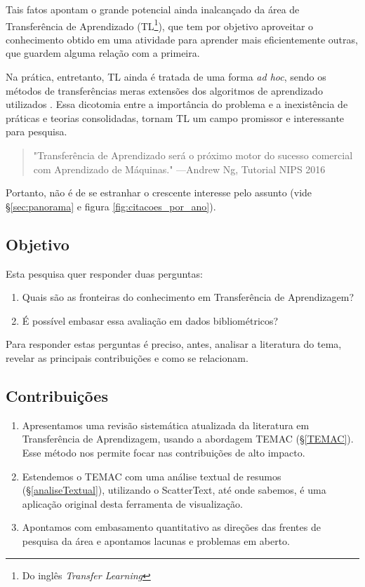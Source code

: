 \documentclass[sigconf]{acmart}
\begin{document}
  Tais fatos apontam  o grande potencial ainda inalcançado da área de Transferência de Aprendizado (TL\footnote{Do inglês \emph{Transfer Learning}}), que tem por objetivo aproveitar o conhecimento obtido em uma atividade para aprender mais eficientemente outras, que guardem alguma relação com a primeira.
  
  Na prática, entretanto, TL ainda é tratada de uma forma \textit{ad hoc}, sendo os métodos de transferências meras extensões dos algoritmos de aprendizado utilizados \cite{torrey}. Essa dicotomia entre a importância do problema e a inexistência de práticas e teorias consolidadas, tornam TL um campo promissor e interessante para pesquisa. 
  
  \begin{quote} "Transferência de Aprendizado será o próximo motor do sucesso comercial com Aprendizado de Máquinas." \hfill ---Andrew Ng, Tutorial NIPS 2016 \cite{ANg}
  \end{quote}

  Portanto, não é de se estranhar o crescente interesse pelo assunto (vide \S\ref{sec:panorama} e figura \ref{fig:citacoes_por_ano}).  

  \subsection{Objetivo}
   Esta pesquisa quer responder duas perguntas:
    \begin{enumerate}
      \item{Quais são as fronteiras do conhecimento em Transferência de Aprendizagem?}
      \item {É possível embasar essa avaliação em dados bibliométricos?}
    \end{enumerate}
    Para responder estas perguntas é preciso, antes, analisar a literatura do tema, revelar as principais contribuições e como se relacionam.
  
  \subsection{Contribuições}

    \begin{enumerate}[C1.]
      \item Apresentamos uma revisão sistemática atualizada da literatura em Transferência de Aprendizagem, usando a abordagem TEMAC (\S \ref{TEMAC}). Esse método nos permite focar nas contribuições de alto impacto. 
      \item Estendemos o TEMAC com uma análise textual de resumos (\S \ref{analiseTextual}), utilizando o ScatterText, até onde sabemos, é uma aplicação original desta ferramenta de visualização.
      \item Apontamos com embasamento quantitativo as direções das frentes de pesquisa da área e apontamos lacunas e problemas em aberto.
    \end{enumerate}
  
\end{document}
